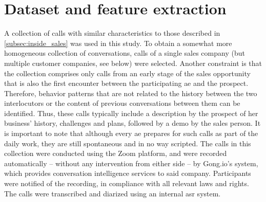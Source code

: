 
\section{Dataset and feature extraction}
\label{sec:dataset_calls}

A collection of calls with similar characteristics to those described in \cref{subsec:inside_sales} was used in this study.
To obtain a somewhat more homogeneous collection of conversations, calls of a single sales company (but multiple customer companies, see below) were selected.
Another constraint is that the collection comprises only calls from an early stage of the sales opportunity that is also the first encounter between the participating \ac{ae} and the prospect.
Therefore, behavior patterns that are not related to the history between the two interlocutors or the content of previous conversations between them can be identified.
Thus, these calls typically include a description by the prospect of her business' history, challenges and plans, followed by a demo by the sales person.
It is important to note that although every \ac{ae} prepares for such calls as part of the daily work, they are still spontaneous and in no way scripted.
The calls in this collection were conducted using the Zoom platform, and were recorded automatically -- without any intervention from either side -- by Gong.io's system, which provides conversation intelligence services to said company.
Participants were notified of the recording, in compliance with all relevant laws and rights.
The calls were transcribed and diarized using an internal \ac{asr} system.

